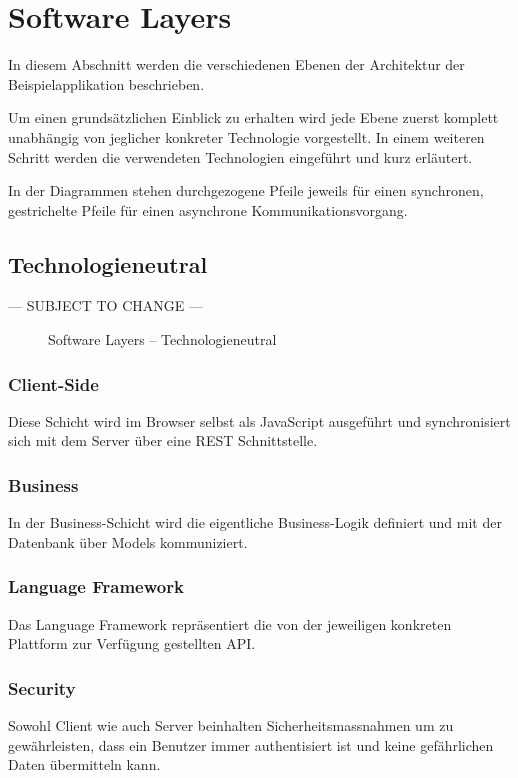 \section{Software Layers}
\label{sec:sad-layers}

In diesem Abschnitt werden die verschiedenen Ebenen der Architektur der Beispielapplikation beschrieben.

Um einen grundsätzlichen Einblick zu erhalten wird jede Ebene zuerst komplett unabhängig von jeglicher konkreter Technologie vorgestellt. In einem weiteren Schritt werden die verwendeten Technologien eingeführt und kurz erläutert.

In der Diagrammen stehen durchgezogene Pfeile jeweils für einen synchronen, gestrichelte Pfeile für einen asynchrone Kommunikationsvorgang.


\subsection*{Technologieneutral}

--- SUBJECT TO CHANGE ---

\begin{figure}[H]
	\centering{
		
	}

	\caption{Software Layers -- Technologieneutral}
\end{figure}

\subsubsection*{Client-Side}
Diese Schicht wird im Browser selbst als JavaScript ausgeführt und synchronisiert sich mit dem Server über eine REST Schnittstelle.

\subsubsection*{Business}
In der Business-Schicht wird die eigentliche Business-Logik definiert und mit der Datenbank über Models kommuniziert.

\subsubsection*{Language Framework}
Das Language Framework repräsentiert die von der jeweiligen konkreten Plattform zur Verfügung gestellten API.

\subsubsection*{Security}
Sowohl Client wie auch Server beinhalten Sicherheitsmassnahmen um zu gewährleisten, dass ein \gls{Benutzer} immer authentisiert ist und keine gefährlichen Daten übermitteln kann.


